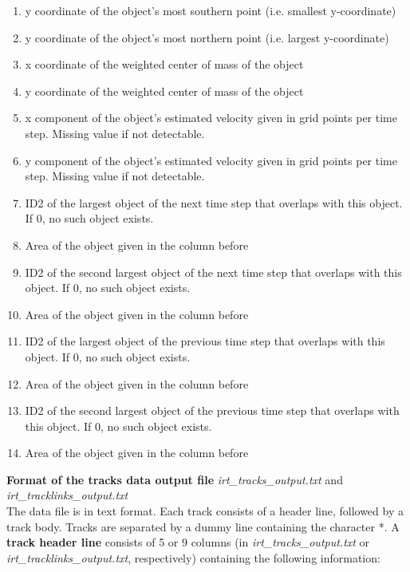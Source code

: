 \documentclass[11pt]{article}
\begin{document}
\begin{enumerate}
\item y coordinate of the object's most southern point (i.e. smallest y-coordinate)
\item y coordinate of the object's most northern point (i.e. largest y-coordinate)
\item x coordinate of the weighted center of mass of the object
\item y coordinate of the weighted center of mass of the object
\item x component of the object's estimated velocity given in grid points per time step. Missing value if not detectable.
\item y component of the object's estimated velocity given in grid points per time step. Missing value if not detectable.
\item ID2 of the largest object of the next time step that overlaps with this object. If 0, no such object exists.
\item Area of the object given in the column before
\item ID2 of the second largest object of the next time step that overlaps with this object. If 0, no such object exists.
\item Area of the object given in the column before
\item ID2 of the largest object of the previous time step that overlaps with this object. If 0, no such object exists.
\item Area of the object given in the column before
\item ID2 of the second largest object of the previous time step that overlaps with this object. If 0, no such object exists.
\item Area of the object given in the column before
\end{enumerate}\vspace{0.5cm}
{\bf Format of the tracks data output file} {\it irt\_tracks\_output.txt} and {\it irt\_tracklinks\_output.txt}\\
The data file is in text format. Each track consists of a header line, followed by a track body. Tracks are separated by a dummy line containing the character *.
A {\bf track header line} consists of 5 or 9 columns (in {\it irt\_tracks\_output.txt} or {\it irt\_tracklinks\_output.txt}, respectively) containing the following information:
\end{document}
